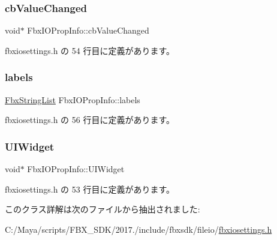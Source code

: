 \subsubsection{\texorpdfstring{cb\+Value\+Changed}{cbValueChanged}}
{\footnotesize\ttfamily void$\ast$ Fbx\+I\+O\+Prop\+Info\+::cb\+Value\+Changed}



 fbxiosettings.\+h の 54 行目に定義があります。

\mbox{\label{class_fbx_i_o_prop_info_adee0d1340eefab937fe4af63e8172c53}} 
\subsubsection{\texorpdfstring{labels}{labels}}
{\footnotesize\ttfamily \hyperlink{class_fbx_string_list}{Fbx\+String\+List} Fbx\+I\+O\+Prop\+Info\+::labels}



 fbxiosettings.\+h の 56 行目に定義があります。

\mbox{\label{class_fbx_i_o_prop_info_a2ea012986e65addbf7ae8cb3db723b7c}} 
\subsubsection{\texorpdfstring{U\+I\+Widget}{UIWidget}}
{\footnotesize\ttfamily void$\ast$ Fbx\+I\+O\+Prop\+Info\+::\+U\+I\+Widget}



 fbxiosettings.\+h の 53 行目に定義があります。



このクラス詳解は次のファイルから抽出されました\+:\begin{DoxyCompactItemize}
\item 
C\+:/\+Maya/scripts/\+F\+B\+X\+\_\+\+S\+D\+K/2017./include/fbxsdk/fileio/\hyperlink{fbxiosettings_8h}{fbxiosettings.\+h}\end{DoxyCompactItemize}
